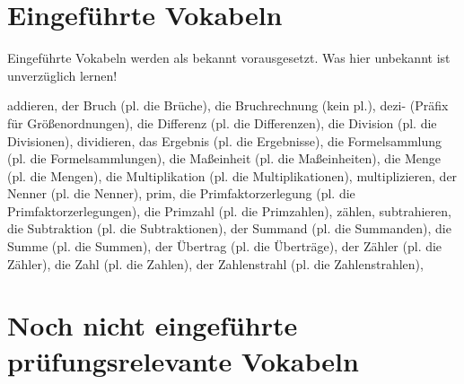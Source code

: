 \section{Eingeführte Vokabeln}

Eingeführte Vokabeln werden als bekannt vorausgesetzt. Was hier unbekannt ist unverzüglich lernen!

addieren,
der Bruch (pl. die Brüche),
die Bruchrechnung (kein pl.),
dezi- (Präfix für Größenordnungen),
die Differenz (pl. die Differenzen),
die Division (pl. die Divisionen),
dividieren,
das Ergebnis (pl. die Ergebnisse),
die Formelsammlung (pl. die Formelsammlungen),
die Maßeinheit (pl. die Maßeinheiten),
die Menge (pl. die Mengen),
die Multiplikation (pl. die Multiplikationen),
multiplizieren,
der Nenner (pl. die Nenner),
prim,
die Primfaktorzerlegung (pl. die Primfaktorzerlegungen),
die Primzahl (pl. die Primzahlen),
zählen,
subtrahieren,
die Subtraktion (pl. die Subtraktionen),
der Summand (pl. die Summanden),
die Summe (pl. die Summen),
der Übertrag (pl. die Überträge),
der Zähler (pl. die Zähler),
die Zahl (pl. die Zahlen),
der Zahlenstrahl (pl. die Zahlenstrahlen),

\section{Noch nicht eingeführte prüfungsrelevante Vokabeln}

